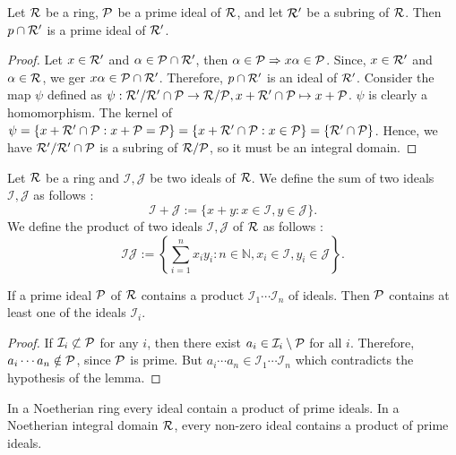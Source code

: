 \begin{lemma}
  Let $\mathcal{R}$ be a ring, $\mathcal{P}$ be a prime ideal of $\mathcal{R}$, and let $\mathcal{R}'$ be a subring of $\mathcal{R}$.  Then $p\cap \mathcal{R}'$ is a prime ideal of $\mathcal{R}'$.
\end{lemma}

\begin{proof}
  Let $x\in \mathcal{R}'$ and $\alpha \in \mathcal{P}\cap \mathcal{R}'$, then $\alpha \in \mathcal{P} \Rightarrow x\alpha \in \mathcal{P}$. Since, $x\in \mathcal{R}'$ and $\alpha \in \mathcal{R}$, we ger $x\alpha \in \mathcal{P}\cap \mathcal{R}'$. Therefore,
  $p\cap \mathcal{R}'$ is an ideal of $\mathcal{R}'$. Consider the map $\psi$ defined as $\psi : \mathcal{R}'/\mathcal{R}'\cap \mathcal{P} \to \mathcal{R}/\mathcal{P}, x+ \mathcal{R}' \cap \mathcal{P} \mapsto x + \mathcal{P}$. $\psi$ is clearly a homomorphism. The kernel of $\psi = \{x+\mathcal{R}'\cap \mathcal{P} : x+\mathcal{P} = \mathcal{P}\} =
  \{x+\mathcal{R}'\cap \mathcal{P} : x\in \mathcal{P}\} = \{\mathcal{R}'\cap \mathcal{P}\}$. Hence, we have $\mathcal{R}'/\mathcal{R}'\cap \mathcal{P}$ is a subring of $\mathcal{R}/\mathcal{P}$, so it must be an integral domain.
\end{proof}


\begin{definition}
  Let $\mathcal{R}$ be a ring and $\mathcal{I},\mathcal{J}$ be two ideals of $\mathcal{R}$. We define the sum of two ideals $\mathcal{I},\mathcal{J}$ as follows :
  \[\mathcal{I}+\mathcal{J} := \{x+y : x\in \mathcal{I}, y\in \mathcal{J}\}.\]
  We define the product of two ideals $\mathcal{I},\mathcal{J}$ of $\mathcal{R}$ as follows :
  \[\mathcal{I}\mathcal{J} := \left\{\sum_{i=1}^n x_i y_i : n\in \mathbb{N}, x_i \in \mathcal{I}, y_i\in \mathcal{J}\right\}.\]
\end{definition}

\begin{lemma}
  If a prime ideal $\mathcal{P}$ of $\mathcal{R}$ contains a product $\mathcal{I}_1\cdots \mathcal{I}_n$ of ideals. Then $\mathcal{P}$ contains at least one of the ideals $\mathcal{I}_i$.
\end{lemma}

\begin{proof}
  If $\mathcal{I}_i\not\subset \mathcal{P}$ for any $i$, then there exist $a_i \in \mathcal{I}_i \setminus \mathcal{P}$ for all $i$. Therefore, $a_i\cdots a_n \notin \mathcal{P}$, since $\mathcal{P}$ is prime. But $a_i \cdots a_n \in \mathcal{I}_1\cdots \mathcal{I}_n$ which contradicts the hypothesis of the lemma.
\end{proof}

\begin{lemma}
  In a Noetherian ring every ideal contain a product of prime ideals. In a Noetherian integral domain $\mathcal{R}$, every non-zero ideal contains a product of prime ideals.
\end{lemma}

